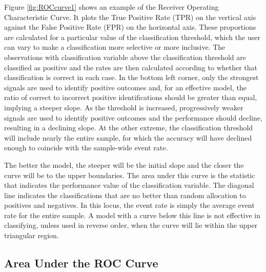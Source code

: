 Figure \ref{fig:ROCcurve1} shows an example of the Receiver Operating Characteristic Curve. 
It plots the True Positive Rate (TPR) on the vertical axis against the False Positive Rate (FPR) on the horizontal axis. 
These proportions are calculated for a particular value of the classification threshold, which the user can vary to make a classification more selective or more inclusive. 
The observations with classification variable above the classification threshold are classified as positive and the rates are then calculated according to whether that classification is correct in each case. 
In the bottom left corner, only the strongest signals are used to identify positive outcomes and, for an effective model, the ratio of correct to incorrect positive identifications should be greater than equal, implying a steeper slope. 
As the threshold is increased, progressively weaker signals are used to identify positive outcomes and the performance should decline, resulting in a declining slope. 
At the other extreme, the classification threshold will include nearly the entire sample, for which the accuracy will have declined enough to coincide with the sample-wide event rate. 



The better the model, the steeper will be the initial slope and the closer the curve will be to the upper boundaries. 
The area under this curve is the statistic that indicates the performance value of the classification variable. 
The diagonal line indicates the classifications that are no better than random allocation to positives and negatives. 
In this locus, the event rate is simply the average event rate for the entire sample. 
A model with a curve below this line is not effective in classifying, unless used in reverse order, when the curve will lie within the upper triangular region. 

\subsection{Area Under the ROC Curve}

